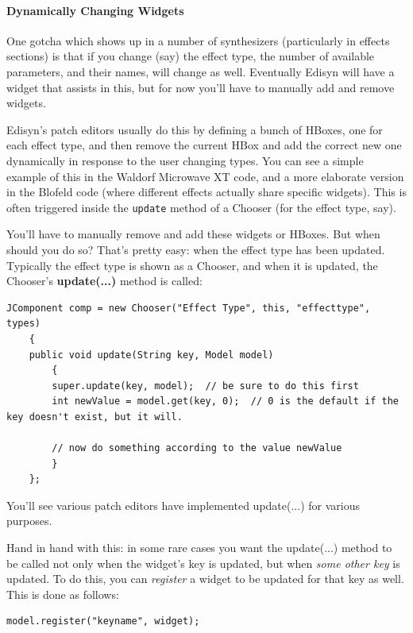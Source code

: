\documentclass{article}
\begin{document}
\paragraph{Dynamically Changing Widgets}

One gotcha which shows up in a number of synthesizers (particularly in effects sections) is that if you change (say) the effect type, the number of available parameters, and their names, will change as well.  Eventually Edisyn will have a widget that assists in this, but for now you'll have to manually add and remove widgets.

Edisyn's patch editors usually do this by defining a bunch of HBoxes, one for each effect type, and then remove the current HBox and add the correct new one dynamically in response to the user changing types.  You can see a simple example of this in the Waldorf Microwave XT code, and a more elaborate version in the Blofeld code (where different effects actually share specific widgets).  This is often triggered inside the {\tt update} method of a Chooser (for the effect type, say).

You'll have to manually remove and add these widgets or HBoxes.  But when should you do so?  That's pretty easy: when the effect type has been updated.  Typically the effect type is shown as a Chooser, and when it is updated, the Chooser's {\bf update(...)} method is called:

\begin{verbatim}
JComponent comp = new Chooser("Effect Type", this, "effecttype", types)
    {
    public void update(String key, Model model)
        {
        super.update(key, model);  // be sure to do this first
        int newValue = model.get(key, 0);  // 0 is the default if the key doesn't exist, but it will.
        
        // now do something according to the value newValue
        }
    };
\end{verbatim}

You'll see various patch editors have implemented update(...) for various purposes.

Hand in hand with this: in some rare cases you want the update(...) method to be called not only when the widget's key is updated, but when {\it some other key} is updated.  To do this, you can {\it register} a widget to be updated for that key as well.  This is done as follows:

\begin{verbatim}
model.register("keyname", widget);
\end{verbatim}
\end{document}
